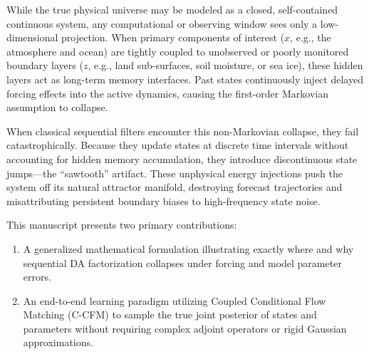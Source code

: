 \documentclass[10pt]{article}
\begin{document}
While the true physical universe may be modeled as a closed, self-contained continuous system, any computational or observing window sees only a low-dimensional projection. When primary components of interest ($x$, e.g., the atmosphere and ocean) are tightly coupled to unobserved or poorly monitored boundary layers ($z$, e.g., land sub-surfaces, soil moisture, or sea ice), these hidden layers act as long-term memory interfaces. Past states continuously inject delayed forcing effects into the active dynamics, causing the first-order Markovian assumption to collapse. 

When classical sequential filters encounter this non-Markovian collapse, they fail catastrophically. Because they update states at discrete time intervals without accounting for hidden memory accumulation, they introduce discontinuous state jumps—the ``sawtooth'' artifact. These unphysical energy injections push the system off its natural attractor manifold, destroying forecast trajectories and misattributing persistent boundary biases to high-frequency state noise.

This manuscript presents two primary contributions:
\begin{enumerate}
    \item A generalized mathematical formulation illustrating exactly where and why sequential DA factorization collapses under forcing and model parameter errors.
    \item An end-to-end learning paradigm utilizing Coupled Conditional Flow Matching (C-CFM) to sample the true joint posterior of states and parameters without requiring complex adjoint operators or rigid Gaussian approximations.
\end{enumerate}

\end{document}
